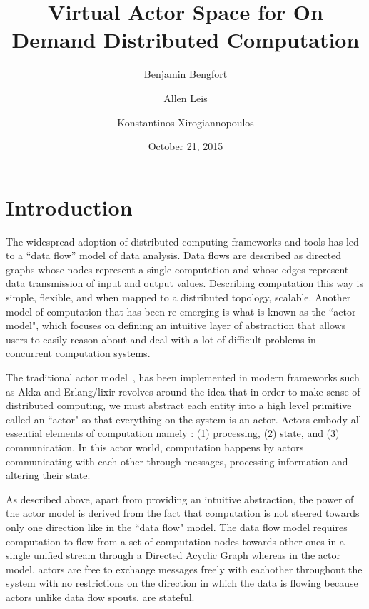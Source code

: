 \documentclass[11pt,letterpaper]{article}
\begin{document}
\title{Virtual Actor Space for On Demand Distributed Computation}
\author[1]{Benjamin Bengfort}
\author[2]{Allen Leis}
\author[1]{Konstantinos Xirogiannopoulos}

\date{October 21, 2015}

\maketitle
\section*{Introduction}
The widespread adoption of distributed computing frameworks and tools has led to a ``data flow'' model of data analysis. Data flows are described as directed graphs whose nodes represent a single computation and whose edges represent data transmission of input and output values. Describing computation this way is simple, flexible, and when mapped to a distributed topology, scalable. Another model of computation that has been re-emerging is what is known as the ``actor model", which focuses on defining an intuitive layer of abstraction that allows users to easily reason about and deal with a lot of difficult problems in concurrent computation systems.

The traditional actor model~\cite{hewitt1973universal}, has been implemented in modern frameworks such as Akka and Erlang/lixir revolves around the idea that in order to make sense of distributed computing, we must abstract each entity into a high level primitive called an ``actor" so that everything on the system is an actor. Actors embody all essential elements of computation namely : (1) processing, (2) state, and (3) communication. In this actor world, computation happens by actors communicating with each-other through messages, processing information and altering their state.

As described above, apart from providing an intuitive abstraction, the power of the actor model is derived from the fact that computation is not steered towards only one direction like in the ``data flow" model. The data flow model requires computation to flow from a set of computation nodes towards other ones in a single unified stream through a Directed Acyclic Graph whereas in the actor model, actors are free to exchange messages freely with eachother throughout the system with no restrictions on the direction in which the data is flowing because actors unlike data flow spouts, are stateful.
\end{document}
